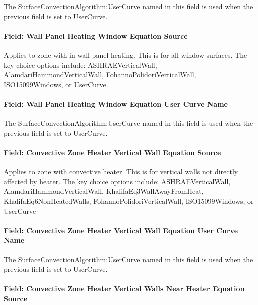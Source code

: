 The SurfaceConvectionAlgorithm:UserCurve named in this field is used when the previous field is set to UserCurve.

\paragraph{Field: Wall Panel Heating Window Equation Source}\label{field-wall-panel-heating-window-equation-source}

Applies to zone with in-wall panel heating. This is for all window surfaces. The key choice options include: ASHRAEVerticalWall, AlamdariHammondVerticalWall, FohannoPolidoriVerticalWall, ISO15099Windows, or UserCurve.

\paragraph{Field: Wall Panel Heating Window Equation User Curve Name}\label{field-wall-panel-heating-window-equation-user-curve-name}

The SurfaceConvectionAlgorithm:UserCurve named in this field is used when the previous field is set to UserCurve.

\paragraph{Field: Convective Zone Heater Vertical Wall Equation Source}\label{field-convective-zone-heater-vertical-wall-equation-source}

Applies to zone with convective heater. This is for vertical walls not directly affected by heater. The key choice options include: ASHRAEVerticalWall, AlamdariHammondVerticalWall, KhalifaEq3WallAwayFromHeat, KhalifaEq6NonHeatedWalls, FohannoPolidoriVerticalWall, ISO15099Windows, or UserCurve

\paragraph{Field: Convective Zone Heater Vertical Wall Equation User Curve Name}\label{field-convective-zone-heater-vertical-wall-equation-user-curve-name}

The SurfaceConvectionAlgorithm:UserCurve named in this field is used when the previous field is set to UserCurve.

\paragraph{Field: Convective Zone Heater Vertical Walls Near Heater Equation Source}\label{field-convective-zone-heater-vertical-walls-near-heater-equation-source}

